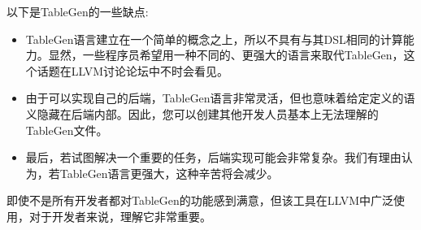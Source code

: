 
以下是TableGen的一些缺点:

\begin{itemize}
\item
TableGen语言建立在一个简单的概念之上，所以不具有与其DSL相同的计算能力。显然，一些程序员希望用一种不同的、更强大的语言来取代TableGen，这个话题在LLVM讨论论坛中不时会看见。

\item
由于可以实现自己的后端，TableGen语言非常灵活，但也意味着给定定义的语义隐藏在后端内部。因此，您可以创建其他开发人员基本上无法理解的TableGen文件。

\item
最后，若试图解决一个重要的任务，后端实现可能会非常复杂。我们有理由认为，若TableGen语言更强大，这种辛苦将会减少。
\end{itemize}

即使不是所有开发者都对TableGen的功能感到满意，但该工具在LLVM中广泛使用，对于开发者来说，理解它非常重要。







